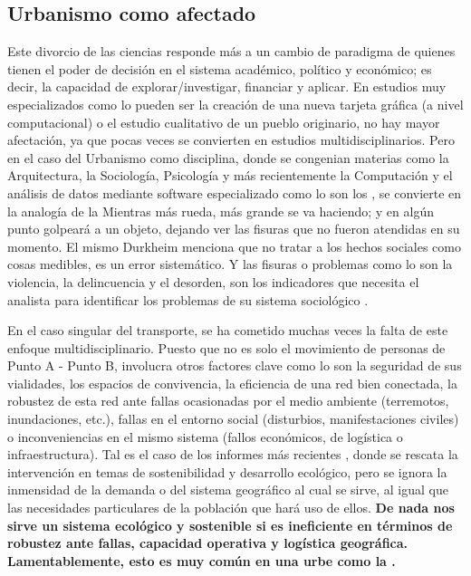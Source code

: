 \subsection{Urbanismo como afectado}
\label{ssec:urbanismo-afectado}
Este divorcio de las ciencias responde más a un cambio de paradigma de quienes tienen el
poder de decisión en el sistema académico, político y económico; es decir, la capacidad de
explorar/investigar, financiar y aplicar. En estudios muy especializados como lo pueden ser
la creación de una nueva tarjeta gráfica (a nivel computacional) o el estudio cualitativo de un
pueblo originario, no hay mayor afectación, ya que pocas veces se convierten en estudios 
multidisciplinarios. Pero en el caso del Urbanismo como disciplina, donde se congenian materias 
como la Arquitectura, la Sociología, Psicología y más recientemente la Computación y el análisis 
de datos mediante software especializado como lo son los , se convierte en la analogía de la  Mientras 
más rueda, más grande se va haciendo; y en algún punto golpeará a un objeto, dejando 
ver las fisuras que no fueron atendidas en su momento. El mismo Durkheim menciona que no 
tratar a los hechos sociales como cosas medibles, es un error sistemático. Y las fisuras o
problemas como lo son la violencia, la delincuencia y el desorden, son los indicadores que
necesita el analista para identificar los problemas de su sistema
sociológico \cite{durkheim_reglas}.

En el caso singular del transporte, se ha 
cometido muchas veces la falta de este enfoque multidisciplinario. Puesto que no es 
solo el movimiento de personas de Punto A - Punto B, involucra otros factores clave 
como lo son la seguridad de sus vialidades, los espacios de convivencia, la eficiencia 
de una red bien conectada, la robustez de esta red ante fallas ocasionadas por el medio 
ambiente (terremotos, inundaciones, etc.), fallas en el entorno social 
(disturbios, manifestaciones civiles) o inconveniencias en el mismo sistema 
(fallos económicos, de logística o infraestructura). Tal es el caso de los informes 
más recientes \cite{ramirez2025analisis}, donde se rescata la intervención en temas de 
sostenibilidad y desarrollo ecológico, pero se ignora la inmensidad de la demanda o 
del sistema geográfico al cual se sirve, al igual que las necesidades particulares 
de la población que hará uso de ellos. \textbf{De nada nos sirve un sistema ecológico y 
sostenible si es ineficiente en términos de robustez ante fallas, capacidad 
operativa y logística geográfica. Lamentablemente, esto es muy común en una 
urbe como la \zmvm.}